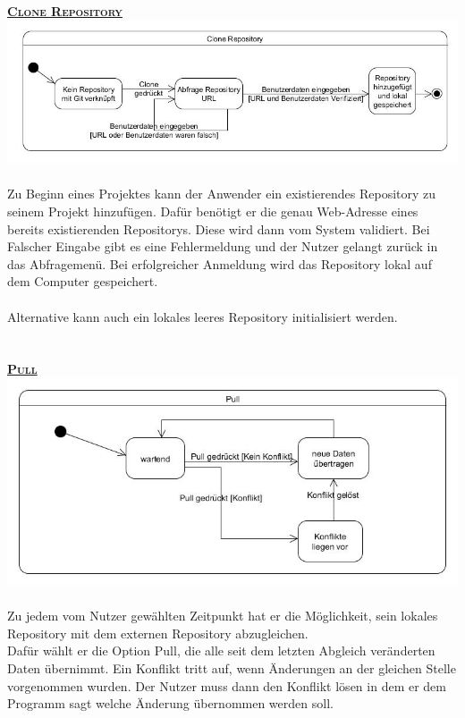 \documentclass[a4paper]{article}
\begin{document}
\newpage	
\underline{\textbf{\textsc{\hypertarget{target}{Clone Repository}}}} \\
\includegraphics[width=\textwidth]{Clone.jpg}\\\\
Zu Beginn eines Projektes kann der Anwender ein existierendes Repository zu seinem Projekt hinzufügen.
Dafür benötigt er die genau Web-Adresse eines bereits existierenden Repositorys. Diese wird dann vom System validiert. Bei Falscher Eingabe gibt es eine Fehlermeldung und der Nutzer gelangt zurück in das Abfragemenü.
Bei erfolgreicher Anmeldung wird das Repository lokal auf dem Computer gespeichert. \\\\
Alternative kann auch ein lokales leeres Repository initialisiert werden.\\\\\\
\underline{\textbf{\textsc{Pull}}}\\
\includegraphics[width=\textwidth]{Pull.jpg}\\\\
Zu jedem vom Nutzer gewählten Zeitpunkt hat er die Möglichkeit, sein lokales Repository mit dem externen Repository abzugleichen. \\
Dafür wählt er die Option Pull, die alle seit dem letzten Abgleich veränderten Daten übernimmt.
Ein Konflikt tritt auf, wenn Änderungen an der gleichen Stelle vorgenommen wurden.
Der Nutzer muss dann den Konflikt lösen in dem er dem Programm sagt welche Änderung übernommen werden soll.
\end{document}
